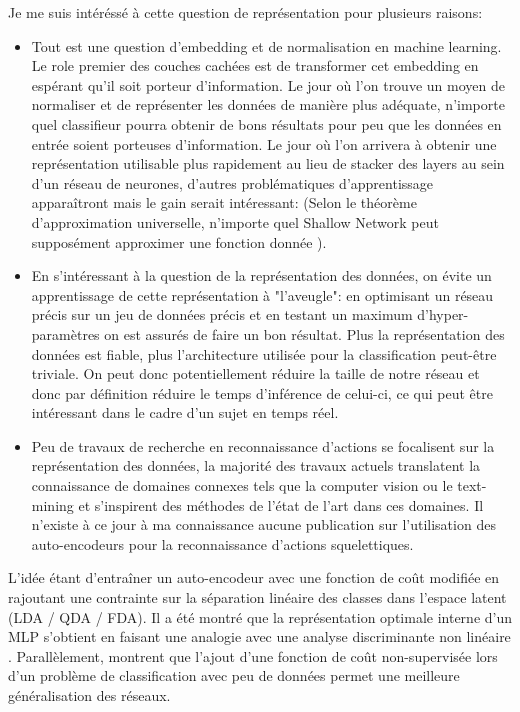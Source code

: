 Je me suis intéréssé à cette question de représentation pour plusieurs raisons:
\begin{itemize}
    \item Tout est une question d'embedding et de normalisation en machine learning. Le role premier des couches cachées est de transformer cet embedding en espérant qu'il soit porteur d'information. Le jour où l'on trouve un moyen de normaliser et de représenter les données de manière plus adéquate, n'importe quel classifieur pourra obtenir de bons résultats pour peu que les données en entrée soient porteuses d'information. Le jour où l'on arrivera à obtenir une représentation utilisable plus rapidement au lieu de stacker des layers au sein d'un réseau de neurones, d'autres problématiques d'apprentissage apparaîtront mais le gain serait intéressant: (Selon le théorème d'approximation universelle, n'importe quel Shallow Network peut supposément approximer une fonction donnée \cite{universalapproxtheorm,scarselli1998universal}). 
    
    \item En s’intéressant à la question de la représentation des données, on évite un apprentissage de cette représentation à "l'aveugle": en optimisant un réseau précis sur un jeu de données précis et en testant un maximum d’hyper-paramètres on est assurés de faire un bon résultat. Plus la représentation des données est fiable, plus l'architecture utilisée pour la classification peut-être triviale.
    On peut donc potentiellement réduire la taille de notre réseau et donc par définition réduire le temps d'inférence de celui-ci, ce qui peut être intéressant dans le cadre d'un sujet en temps réel.
    
    \item Peu de travaux de recherche en reconnaissance d'actions se focalisent sur la représentation des données, la majorité des travaux actuels translatent la connaissance de domaines connexes tels que la computer vision ou le text-mining et s'inspirent des méthodes de l'état de l'art dans ces domaines. Il n'existe à ce jour à ma connaissance aucune publication sur l'utilisation des auto-encodeurs pour la reconnaissance d'actions squelettiques.
\end{itemize}

L'idée étant d’entraîner un auto-encodeur avec une fonction de coût modifiée en rajoutant une contrainte sur la séparation linéaire des classes dans l'espace latent (LDA / QDA / FDA). Il a été montré que la représentation optimale interne d'un MLP s'obtient en faisant une analogie avec une analyse discriminante non linéaire \cite{webb1990optimised}. Parallèlement, \cite{2020arXiv200312843B} montrent que l'ajout d'une fonction de coût non-supervisée lors d'un problème de classification avec peu de données permet une meilleure généralisation des réseaux.


